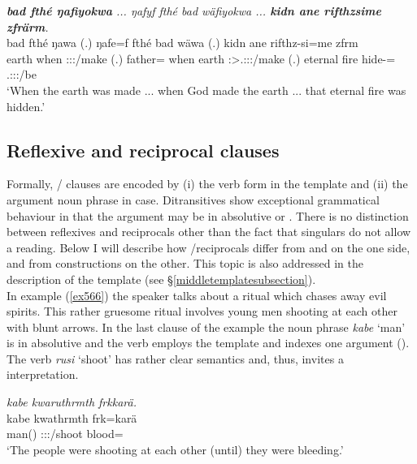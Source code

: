 \begin{exe}
	\ex \emph{\textbf{bad fthé ŋafiyokwa} ... ŋafyf fthé bad wäfiyokwa ... \textbf{kidn ane rifthzsime zfrärm}.}\\
	\gll bad fthé ŋawa (.) ŋafe=f fthé bad wäwa (.) kidn ane rifthz-si=me zfrm\\
	earth when \Sg:\Sbj:\Pst:\Ipfv/make (.) father=\Erg{} when earth \Stsg:\Sbj>\Tsg.\F:\Obj:\Pst:\Ipfv/make (.) {eternal fire} \Dem{} hide-\Nmlz=\Ins{} \Tsg.\F:\Sbj:\Pst:\Dur/be\\
	\trans `When the earth was made ... when God made the earth ... that eternal fire was hidden.'
	\label{ex554}
\end{exe}

\subsection{Reflexive and reciprocal clauses}\label{reflrecipclause}

Formally, / clauses are encoded by (i) the verb form in the  template and (ii) the argument noun phrase in  case. Ditransitives show exceptional grammatical behaviour in that the argument may be in absolutive or  . There is no distinction between reflexives and reciprocals other than the fact that singulars do not allow a  reading. Below I will describe how /reciprocals differ from  and   on the one side, and from  constructions on the other. This topic is also addressed in the description of the  template (see \S{}\ref{middletemplatesubsection}).\\

In example (\ref{ex566}) the speaker talks about a ritual which chases away evil spirits. This rather gruesome ritual involves young men shooting at each other with blunt arrows. In the last clause of the example the noun phrase \emph{kabe} `man' is in absolutive  and the verb employs the  template and indexes one argument (\Stpl). The verb \emph{rusi} `shoot' has rather clear  semantics and, thus, invites a  interpretation.

\begin{exe}
	\ex \emph{kabe kwaruthrmth frkkarä.}\\
	\gll kabe kwathrmth frk=karä\\
	man(\Abs) \Stpl:\Sbj:\Pst:\Dur/shoot blood=\Prop\\
	\trans `The people were shooting at each other (until) they were bleeding.'
	\label{ex566}
\end{exe}

